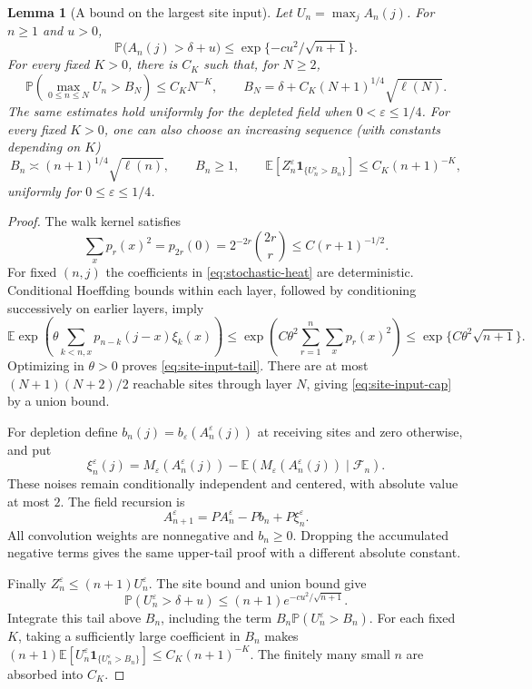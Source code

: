 \documentclass[11pt]{article}
\numberwithin{equation}{section}
\newtheorem{lemma}[theorem]{Lemma}
\theoremstyle{definition}
\newcommand{\E}{\mathbb E}
\newcommand{\Prob}{\mathbb P}
\newcommand{\ind}{\mathbf 1}
\begin{document}
\begin{lemma}[A bound on the largest site input]\label{lem:site-input-cap}
Let $U_n=\max_j A_n(j)$. For $n\ge1$ and $u>0$,
\begin{equation}\label{eq:site-input-tail}
 \Prob\bigl(A_n(j)>\delta+u\bigr)
 \le \exp\{-c u^2/\sqrt{n+1}\}.
\end{equation}
For every fixed $K>0$, there is $C_K$ such that, for $N\ge2$,
\begin{equation}\label{eq:site-input-cap}
 \Prob\left(\max_{0\le n\le N}U_n>
 B_N\right)\le C_K N^{-K},\qquad
 B_N=\delta+C_K(N+1)^{1/4}\sqrt{\ell(N)}.
\end{equation}
The same estimates hold uniformly for the depleted field when $0<\varepsilon\le1/4$. For every fixed $K>0$, one can also choose an increasing sequence (with constants depending on $K$)
\begin{equation}\label{eq:input-cap-error}
 B_n\asymp(n+1)^{1/4}\sqrt{\ell(n)},\qquad B_n\ge1,
 \qquad \E[Z_n^\varepsilon\ind_{\{U_n^\varepsilon>B_n\}}]
 \le C_K(n+1)^{-K},
\end{equation}
uniformly for $0\le\varepsilon\le1/4$.
\end{lemma}
\begin{proof}
The walk kernel satisfies
\[
 \sum_xp_r(x)^2=p_{2r}(0)=2^{-2r}\binom{2r}{r}
 \le C(r+1)^{-1/2}.
\]
For fixed $(n,j)$ the coefficients in \eqref{eq:stochastic-heat} are deterministic. Conditional Hoeffding bounds within each layer, followed by conditioning successively on earlier layers, imply
\[
 \E\exp\left(\theta\sum_{k<n,x}p_{n-k}(j-x)\xi_k(x)\right)
 \le\exp\left(C\theta^2\sum_{r=1}^n\sum_xp_r(x)^2\right)
 \le\exp\{C\theta^2\sqrt{n+1}\}.
\]
Optimizing in $\theta>0$ proves \eqref{eq:site-input-tail}. There are at most $(N+1)(N+2)/2$ reachable sites through layer $N$, giving \eqref{eq:site-input-cap} by a union bound.

For depletion define $b_n(j)=b_\varepsilon(A_n^\varepsilon(j))$ at receiving sites and zero otherwise, and put
\[
 \xi_n^\varepsilon(j)=M_\varepsilon(A_n^\varepsilon(j))
 -\E(M_\varepsilon(A_n^\varepsilon(j))\mid\mathcal F_n).
\]
These noises remain conditionally independent and centered, with absolute value at most $2$. The field recursion is
\[
 A_{n+1}^\varepsilon=P A_n^\varepsilon-P b_n+P\xi_n^\varepsilon.
\]
All convolution weights are nonnegative and $b_n\ge0$. Dropping the accumulated negative terms gives the same upper-tail proof with a different absolute constant.

Finally $Z_n^\varepsilon\le(n+1)U_n^\varepsilon$. The site bound and union bound give
\[
 \Prob(U_n^\varepsilon>\delta+u)
 \le(n+1)e^{-c u^2/\sqrt{n+1}}.
\]
Integrate this tail above $B_n$, including the term $B_n\Prob(U_n^\varepsilon>B_n)$. For each fixed $K$, taking a sufficiently large coefficient in $B_n$ makes $(n+1)\E[U_n^\varepsilon\ind_{\{U_n^\varepsilon>B_n\}}]\le C_K(n+1)^{-K}$. The finitely many small $n$ are absorbed into $C_K$.
\end{proof}
\end{document}
